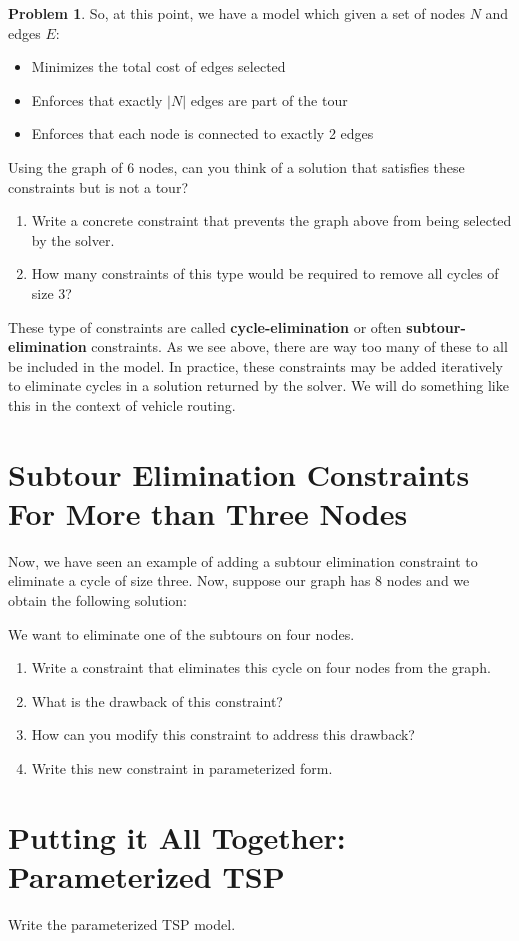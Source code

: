 \documentclass[11pt]{article}
\theoremstyle{definition}
\newtheorem{problem}{Problem}
\begin{document}
\begin{problem}
\newpage
So, at this point, we have a model which given a set of nodes $N$ and edges $E$:
\begin{itemize}
\item Minimizes the total cost of edges selected
\item Enforces that exactly $|N|$ edges are part of the tour
\item Enforces that each node is connected to exactly 2 edges
\end{itemize}

Using the graph of 6 nodes, can you think of a solution that satisfies these constraints but is not a tour? \vfill

\begin{enumerate}[resume]
\item Write a concrete constraint that prevents the graph above from being selected by the solver. \vfill
\item How many constraints of this type would be required to remove all cycles of size 3? \vfill
\end{enumerate}



\begin{tcolorbox}
These type of constraints are called \textbf{cycle-elimination} or often \textbf{subtour-elimination} constraints. As we see above, there are way too many of these to all be included in the model. In practice, these constraints may be added iteratively to eliminate cycles in a solution returned by the solver.  We will do something like this in the context of vehicle routing.
\end{tcolorbox}

\newpage

\section{Subtour Elimination Constraints For More than Three Nodes}

Now, we have seen an example of adding a subtour elimination constraint to eliminate a cycle of size three. Now, suppose our graph has 8 nodes and we obtain the following solution: \vfill


We want to eliminate one of the subtours on four nodes.

\begin{enumerate}[resume]
\item Write a constraint that eliminates this cycle on four nodes from the graph. \vfill
\item What is the drawback of this constraint? \vspace{1in}
\item How can you modify this constraint to address this drawback? \vfill
\item Write this new constraint in parameterized form. \vfill
\end{enumerate}

\newpage

\section{Putting it All Together: Parameterized TSP}

Write the parameterized TSP model.
\end{problem}
\end{document}
